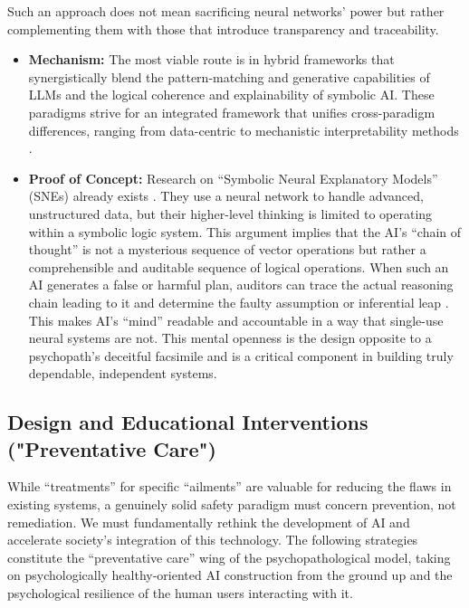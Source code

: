 \documentclass{article}
\begin{document}
Such an approach does not mean sacrificing neural networks' power but rather complementing them with those that introduce transparency and traceability.
\begin{itemize}
    \item \textbf{Mechanism:} The most viable route is in hybrid frameworks that synergistically blend the pattern-matching and generative capabilities of LLMs and the logical coherence and explainability of symbolic AI. These paradigms strive for an integrated framework that unifies cross-paradigm differences, ranging from data-centric to mechanistic interpretability methods \citep{ref34}.
    \item \textbf{Proof of Concept:} Research on “Symbolic Neural Explanatory Models” (SNEs) already exists \citep{ref45}. They use a neural network to handle advanced, unstructured data, but their higher-level thinking is limited to operating within a symbolic logic system. This argument implies that the AI's “chain of thought” is not a mysterious sequence of vector operations but rather a comprehensible and auditable sequence of logical operations. When such an AI generates a false or harmful plan, auditors can trace the actual reasoning chain leading to it and determine the faulty assumption or inferential leap \citep{ref46}. This makes AI's “mind” readable and accountable in a way that single-use neural systems are not. This mental openness is the design opposite to a psychopath's deceitful facsimile and is a critical component in building truly dependable, independent systems.
\end{itemize}

\subsection{Design and Educational Interventions ("Preventative Care")}
While “treatments” for specific “ailments” are valuable for reducing the flaws in existing systems, a genuinely solid safety paradigm must concern prevention, not remediation. We must fundamentally rethink the development of AI and accelerate society's integration of this technology. The following strategies constitute the “preventative care” wing of the psychopathological model, taking on psychologically healthy-oriented AI construction from the ground up and the psychological resilience of the human users interacting with it.
\end{document}
